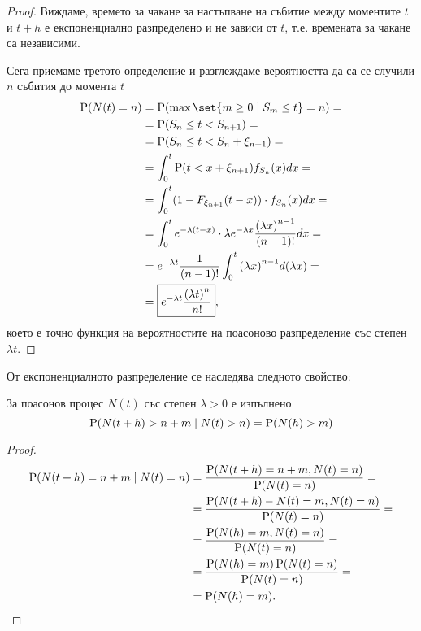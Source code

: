 \documentclass{../../common/topic}
\begin{document}
\begin{proof}
  Виждаме, времето за чакане за настъпване на събитие между моментите \( t \) и \( t+h \) е експоненциално разпределено и не зависи от \( t \), т.е. времената за чакане са независими.

   Сега приемаме третото определение и разглеждаме вероятността да са се случили \( n \) събития до момента \( t \)
  \begin{align*}
    \Prob(N(t) = n)
    &=
    \Prob(\max \set{ m \geq 0 \mid S_m \leq t } = n)
    = \\ &=
    \Prob(S_n \leq t < S_{n+1})
    = \\ &=
    \Prob(S_n \leq t < S_n + \xi_{n+1})
    = \\ &=
    \int_0^t \Prob(t < x + \xi_{n+1}) f_{S_n} (x) dx
    = \\ &=
    \int_0^t (1 - F_{\xi_{n+1}} (t - x)) \cdot f_{S_n} (x) dx
    = \\ &=
    \int_0^t e^{-\lambda (t-x)} \cdot \lambda e^{-\lambda x} \frac {{(\lambda x)}^{n-1}} {(n-1)!} dx
    = \\ &=
    e^{-\lambda t} \frac 1 {(n-1)!} \int_0^t {(\lambda x)}^{n-1} d(\lambda x)
    = \\ &=
    \boxed{e^{-\lambda t} \frac {{(\lambda t)}^n} {n!}},
  \end{align*}
  което е точно функция на вероятностите на поасоново разпределение със степен \( \lambda t \).
\end{proof}

От експоненциалното разпределение се наследява следното свойство:
\begin{proposition}
  За поасонов процес \( N(t) \) със степен \( \lambda > 0 \) е изпълнено
  \begin{equation*}
    \operatorname{P}(N(t+h) > n + m \mid N(t) > n)
    =
    \operatorname{P}(N(h) > m)
  \end{equation*}
\end{proposition}
\begin{proof}
  \begin{align*}
    \operatorname{P}(N(t+h) = n + m \mid N(t) = n)
    &=
    \frac {\operatorname{P}(N(t+h) = n + m, N(t) = n)} {\operatorname{P}(N(t) = n)}
    = \\ &=
    \frac {\operatorname{P}(N(t+h) - N(t) = m, N(t) = n)} {\operatorname{P}(N(t) = n)}
    = \\ &=
    \frac {\operatorname{P}(N(h) = m, N(t) = n)} {\operatorname{P}(N(t) = n)}
    = \\ &=
    \frac {\operatorname{P}(N(h) = m) \operatorname{P}(N(t) = n)} {\operatorname{P}(N(t) = n)}
    = \\ &=
    \operatorname{P}(N(h) = m).
  \end{align*}
\end{proof}
\end{document}
